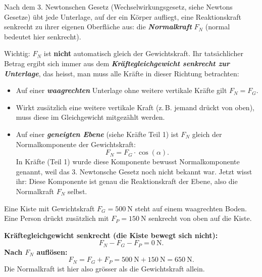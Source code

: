 \documentclass[addpoints,11pt,a4paper]{exam}
\begin{document}
\begin{theoriebox}
Nach dem 3. Newtonschen Gesetz (Wechselwirkungsgesetz, siehe Newtons
Gesetze) übt jede Unterlage, auf der ein Körper aufliegt, eine
Reaktionskraft senkrecht zu ihrer eigenen Oberfläche aus: die
\textbf{\emph{Normalkraft}} $F_N$ (\glqq normal\grqq{} bedeutet hier
\glqq senkrecht\grqq{}).

Wichtig: $F_N$ ist \textbf{nicht} automatisch gleich der Gewichtskraft.
Ihr tatsächlicher Betrag ergibt sich immer aus dem
\textbf{\emph{Kräftegleichgewicht senkrecht zur Unterlage}}, das heisst,
man muss alle Kräfte in dieser Richtung betrachten:
\begin{itemize}[leftmargin=1.2cm,itemsep=0.25em]
  \item Auf einer \textbf{\emph{waagrechten}} Unterlage ohne weitere
  vertikale Kräfte gilt $F_N = F_G$.
  \item Wirkt zusätzlich eine weitere vertikale Kraft (z.\,B. jemand
  drückt von oben), muss diese im Gleichgewicht mitgezählt werden.
  \item Auf einer \textbf{\emph{geneigten Ebene}} (siehe Kräfte Teil 1)
  ist $F_N$ gleich der Normalkomponente der Gewichtskraft:
  \[
    \boxed{F_N = F_G\cdot\cos(\alpha)}.
  \]
  In Kräfte (Teil 1) wurde diese Komponente bewusst
  \glqq Normalkomponente\grqq{} genannt, weil das 3. Newtonsche Gesetz
  noch nicht bekannt war. Jetzt wisst ihr: Diese Komponente ist genau die
  Reaktionskraft der Ebene, also die Normalkraft $F_N$ selbst.
\end{itemize}
\end{theoriebox}

\begin{beispielbox}
Eine Kiste mit Gewichtskraft $F_G=\SI{500}{\newton}$ steht auf einem
waagrechten Boden. Eine Person drückt zusätzlich mit $F_P=\SI{150}{\newton}$
senkrecht von oben auf die Kiste.

\textbf{Kräftegleichgewicht senkrecht (die Kiste bewegt sich nicht):}
\[
  F_N - F_G - F_P = \SI{0}{\newton}.
\]
\textbf{Nach $F_N$ auflösen:}
\[
  \boxed{F_N = F_G + F_P} = \SI{500}{\newton}+\SI{150}{\newton} = \SI{650}{\newton}.
\]
Die Normalkraft ist hier also grösser als die Gewichtskraft allein.
\end{beispielbox}
\end{document}
